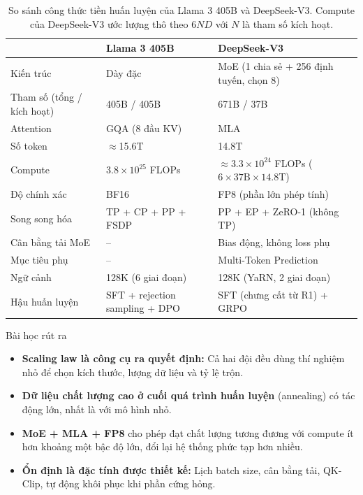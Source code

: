 \begin{table}[H]
\centering
\caption{So sánh công thức tiền huấn luyện của Llama 3 405B và DeepSeek-V3. Compute của DeepSeek-V3 ước lượng thô theo $6ND$ với $N$ là tham số kích hoạt.}
\label{tab:llama3_vs_deepseekv3}
\begin{tabularx}{\textwidth}{@{}lXX@{}}
\toprule
 & \textbf{Llama 3 405B} & \textbf{DeepSeek-V3} \\
\midrule
Kiến trúc & Dày đặc & MoE (1 chia sẻ + 256 định tuyến, chọn 8) \\
Tham số (tổng / kích hoạt) & 405B / 405B & 671B / 37B \\
Attention & GQA (8 đầu KV) & MLA \\
Số token & $\approx$15.6T & 14.8T \\
Compute & $3.8 \times 10^{25}$ FLOPs & $\approx 3.3 \times 10^{24}$ FLOPs ($6 \times 37\text{B} \times 14.8\text{T}$) \\
Độ chính xác & BF16 & FP8 (phần lớn phép tính) \\
Song song hóa & TP + CP + PP + FSDP & PP + EP + ZeRO-1 (không TP) \\
Cân bằng tải MoE & -- & Bias động, không loss phụ \\
Mục tiêu phụ & -- & Multi-Token Prediction \\
Ngữ cảnh & 128K (6 giai đoạn) & 128K (YaRN, 2 giai đoạn) \\
Hậu huấn luyện & SFT + rejection sampling + DPO & SFT (chưng cất từ R1) + GRPO \\
\bottomrule
\end{tabularx}
\end{table}

\begin{assess}{Bài học rút ra}
\begin{itemize}
	\item \textbf{Scaling law là công cụ ra quyết định:} Cả hai đội đều dùng thí nghiệm nhỏ để chọn kích thước, lượng dữ liệu và tỷ lệ trộn.
	\item \textbf{Dữ liệu chất lượng cao ở cuối quá trình huấn luyện} (annealing) có tác động lớn, nhất là với mô hình nhỏ.
	\item \textbf{MoE + MLA + FP8} cho phép đạt chất lượng tương đương với compute ít hơn khoảng một bậc độ lớn, đổi lại hệ thống phức tạp hơn nhiều.
	\item \textbf{Ổn định là đặc tính được thiết kế:} Lịch batch size, cân bằng tải, QK-Clip, tự động khôi phục khi phần cứng hỏng.
\end{itemize}
\end{assess}

